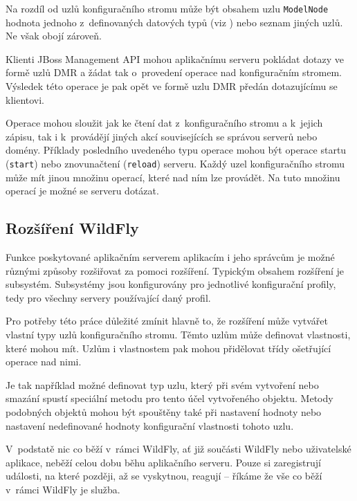 Na rozdíl od uzlů konfiguračního stromu může být obsahem uzlu {\tt ModelNode} hodnota jednoho z~definovaných datových typů (viz \cite{jboss7slideShare}) nebo seznam jiných uzlů. Ne však obojí zároveň.
\cite{jboss7slideShare}

Klienti JBoss Management API mohou aplikačnímu serveru pokládat dotazy ve formě uzlů DMR a žádat tak o~provedení operace nad konfiguračním stromem.
Výsledek této operace je pak opět ve formě uzlu DMR předán dotazujícímu se klientovi.
\cite{jbossDetypedManagement}

Operace mohou sloužit jak ke čtení dat z~konfiguračního stromu a k~jejich zápisu, tak i k~provádějí jiných akcí souvisejících se správou serverů nebo domény.
Příklady posledního uvedeného typu operace mohou být operace startu ({\tt start}) nebo znovunačtení ({\tt reload}) serveru.
Každý uzel konfiguračního stromu může mít jinou množinu operací, které nad ním lze provádět.
Na tuto množinu operací je možné se serveru dotázat.
\cite{jbossDetypedManagement}

\subsection{Rozšíření WildFly} \label{rozsireniWildFly}

Funkce poskytované aplikačním serverem aplikacím i jeho správcům je možné různými způsoby rozšiřovat za pomoci rozšíření.
Typickým obsahem rozšíření je subsystém. Subsystémy jsou konfigurovány pro jednotlivé konfigurační profily, tedy pro všechny servery používající daný profil.

Pro potřeby této práce důležité zmínit hlavně to, že rozšíření může vytvářet vlastní typy uzlů konfiguračního stromu.
Těmto uzlům může definovat vlastnosti, které mohou mít.
Uzlům i vlastnostem pak mohou přidělovat třídy ošetřující operace nad nimi.
\cite{WildFlyExtending}

Je tak například možné definovat typ uzlu, který při svém vytvoření nebo smazání spustí speciální metodu pro tento účel vytvořeného objektu.
Metody podobných objektů mohou být spouštěny také při nastavení hodnoty nebo nastavení nedefinované hodnoty konfigurační vlastnosti tohoto uzlu.

V~podstatě nic co běží v~rámci WildFly, ať již součásti WildFly nebo uživatelské aplikace, neběží celou dobu běhu aplikačního serveru.
Pouze si zaregistrují události, na které později, až se vyskytnou, reagují -- říkáme že vše co běží v~rámci WildFly je služba. \cite{jboss7slideShare}

